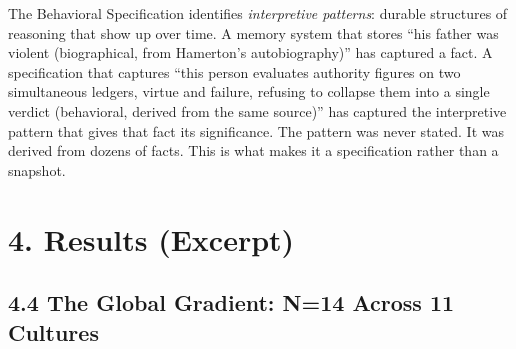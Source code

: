 \documentclass[11pt,a4paper]{article}
\begin{document}
The Behavioral Specification identifies \textit{interpretive patterns}: durable structures
of reasoning that show up over time. A memory system that stores ``his father was violent
(biographical, from Hamerton's autobiography)'' has captured a fact. A specification that
captures ``this person evaluates authority figures on two simultaneous ledgers, virtue and
failure, refusing to collapse them into a single verdict (behavioral, derived from the same
source)'' has captured the interpretive pattern that gives that fact its significance. The
pattern was never stated. It was derived from dozens of facts. This is what makes it a
specification rather than a snapshot.

\section{4. Results (Excerpt)}

\subsection{4.4 The Global Gradient: N=14 Across 11 Cultures}
\end{document}
